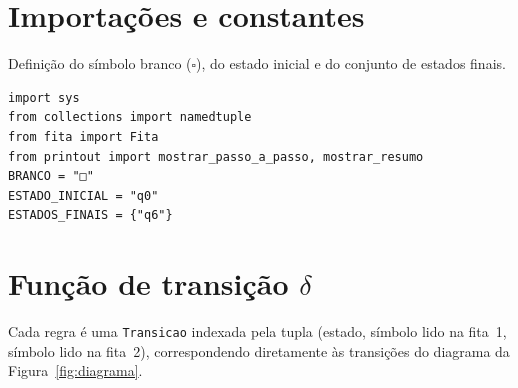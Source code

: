 \documentclass[report, 12pt]{uftreport}
\begin{document}
\section{Importações e constantes}

Definição do símbolo branco ($\square$), do estado inicial e do conjunto de estados finais.

\begin{lstlisting}[style=python, caption={Importações e constantes}, label={lst:const}]
import sys
from collections import namedtuple
from fita import Fita
from printout import mostrar_passo_a_passo, mostrar_resumo
BRANCO = "□"
ESTADO_INICIAL = "q0"
ESTADOS_FINAIS = {"q6"}
\end{lstlisting}

\section{Função de transição $\delta$}

Cada regra é uma \texttt{Transicao} indexada pela tupla (estado, símbolo lido na fita~1, símbolo lido na fita~2), correspondendo diretamente às transições do diagrama da Figura~\ref{fig:diagrama}.
\end{document}
